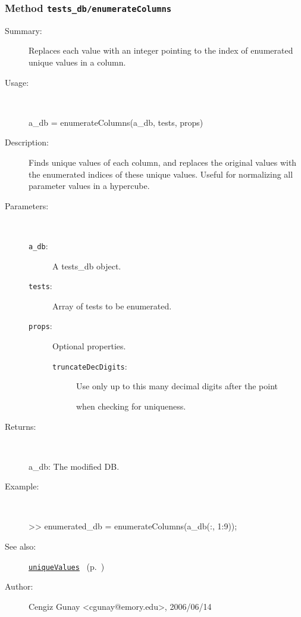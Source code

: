 \subsubsection[Method \texttt{enumerateColumns}]{Method \texttt{tests\_db/enumerateColumns}}%
%
\label{ref_tests_db__enumerateColumns}%
\hypertarget{ref_tests_db__enumerateColumns}{}%
\begin{description}
\item[Summary:]Replaces each value with an integer pointing to the index of enumerated unique values in a column.
%
\item[Usage:]~%
\begin{lyxcode}%
a\_db = enumerateColumns(a\_db, tests, props)
%
\end{lyxcode}%
%
\item[Description:]%
Finds unique values of each column, and replaces the original values
 with the enumerated indices of these unique values. Useful for normalizing all 
 parameter values in a hypercube.
\item[Parameters:]~
\begin{description}%
\item[\texttt{a\_db}:]
 A tests\_db object.
\item[\texttt{tests}:]
 Array of tests to be enumerated.
\item[\texttt{props}:]
 Optional properties.
\begin{description}%
\item[\texttt{truncateDecDigits}:]
 Use only up to this many decimal digits after the point 

when checking for uniqueness.
\end{description}%
\end{description}%
%
\item[Returns:
]~

	a\_db: The modified DB.
%
\item[Example:]~
\begin{lyxcode} >> enumerated\_db = enumerateColumns(a\_db(:, 1:9));
\\%
\end{lyxcode}
%
\item[See also:]%
\hyperlink{ref_uniqueValues}{\texttt{uniqueValues}}%
\ (p.~\pageref{ref_uniqueValues})%
%
%
\item[Author:]%
Cengiz Gunay <cgunay@emory.edu>, 2006/06/14
%
\end{description}
\methodline%
